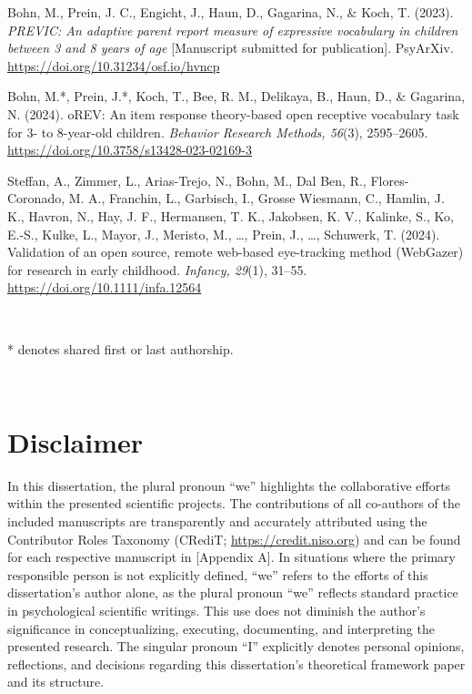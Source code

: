 \documentclass[
]{scrbook}
\begin{document}
Bohn, M., Prein, J. C., Engicht, J., Haun, D., Gagarina, N., \& Koch, T. (2023). \emph{PREVIC: An adaptive parent report measure of expressive vocabulary in children between 3 and 8 years of age} {[}Manuscript submitted for publication{]}. PsyArXiv. \mbox{\url{https://doi.org/10.31234/osf.io/hvncp}}

Bohn, M.*, Prein, J.*, Koch, T., Bee, R. M., Delikaya, B., Haun, D., \& Gagarina, N. (2024). oREV: An item response theory-based open receptive vocabulary task for 3- to 8-year-old children. \emph{Behavior Research Methods, 56}(3), 2595--2605. \mbox{\url{https://doi.org/10.3758/s13428-023-02169-3}}

Steffan, A., Zimmer, L., Arias-Trejo, N., Bohn, M., Dal Ben, R., Flores-Coronado, M. A., Franchin, L., Garbisch, I., Grosse Wiesmann, C., Hamlin, J. K., Havron, N., Hay, J. F., Hermansen, T. K., Jakobsen, K. V., Kalinke, S., Ko, E.-S., Kulke, L., Mayor, J., Meristo, M., \ldots, Prein, J., \ldots, Schuwerk, T. (2024). Validation of an open source, remote web-based eye-tracking method (WebGazer) for research in early childhood. \emph{Infancy, 29}(1), 31--55. \mbox{\url{https://doi.org/10.1111/infa.12564}}

~

* denotes shared first or last authorship.

~
~
~
~

\begingroup
\renewcommand{\cleardoublepage}{}
\renewcommand{\clearpage}{}

\chapter{Disclaimer}\label{disclaimer}

In this dissertation, the plural pronoun ``we'' highlights the collaborative efforts within the presented scientific projects. The contributions of all co-authors of the included manuscripts are transparently and accurately attributed using the Contributor Roles Taxonomy (CRediT; \mbox{\url{https://credit.niso.org}}) and can be found for each respective manuscript in {[}Appendix A{]}. In situations where the primary responsible person is not explicitly defined, ``we'' refers to the efforts of this dissertation's author alone, as the plural pronoun ``we'' reflects standard practice in psychological scientific writings. This use does not diminish the author's significance in conceptualizing, executing, documenting, and interpreting the presented research. The singular pronoun ``I'' explicitly denotes personal opinions, reflections, and decisions regarding this dissertation's theoretical framework paper and its structure.
\endgroup
\end{document}
